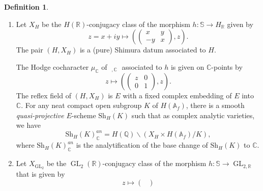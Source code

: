 \documentclass[11pt, a4paper]{amsart}
\theoremstyle{plain}
\theoremstyle{definition}
\newtheorem{definition}[theorem]{Definition}
\numberwithin{equation}{section}
\def\AAA{\mathbb{A}}
\def\CC{\mathbb{C}}
\def\QQ{\mathbb{Q}}
\def\RR{\mathbb{R}}
\DeclareMathOperator{\GL}{\mathrm{GL}}
\DeclareMathOperator{\Gm}{\mathrm{G_{m}}}
\newcommand{\Sh}{\mathrm{Sh}}
\begin{document}
\begin{definition}
\begin{enumerate}
              \begin{equation*}
                  \Sh_{G}(L)_{\CC}^{an} = G(\QQ) \backslash (X_{G} \times G(\AAA_f) / L), 
              \end{equation*}
              where $\Sh_{G}(L)_{\CC}^{an}$ is the analytification of the base change of $\Sh_{G}(L)$ to $\CC$. 
              \item  Let $X_{H}$ be the $H(\RR)$-conjugacy class of the morphism $h \colon \mathbb{S} \rightarrow H_{\RR}$ given by 
              \begin{equation*}
                  z = x + iy \mapsto (\begin{pmatrix}
                                        x & y \\
                                        -y & x
                                     \end{pmatrix}, z). 
              \end{equation*}
              The pair $(H, X_H)$ is a (pure) Shimura datum associated to $H$. 
              \par The Hodge cocharacter $\mu_{\CC}$ of $\Gm_{, \CC}$ associated to $h$ is given on $\CC$-points by 
              \begin{equation*}
                  z \mapsto (\begin{pmatrix}
                                z & 0 \\
                                0 & 1 
                            \end{pmatrix}, z).
              \end{equation*}
              The reflex field of $(H, X_H)$ is $E$ with a fixed complex embedding of $E$ into $\CC$. 
              For any neat compact open subgroup $K$ of $H(\AAA_f)$, there is a smooth \textit{quasi-projective} $E$-scheme $\Sh_{H}(K)$ such that as complex analytic varieties, we have 
              \begin{equation*}
                  \Sh_{H}(K)_{\CC}^{an} = H(\QQ) \backslash (X_H \times H(\AAA_f) / K), 
              \end{equation*}
              where $\Sh_{H}(K)_{\CC}^{an}$ is the analytification of the base change of $\Sh_{H}(K)$ to $\CC$.
        \item Let $X_{\GL_2}$ be the $\GL_2(\RR)$-conjugacy class of the morphism $h \colon \mathbb{S} \rightarrow \GL_{2,\RR}$ that is given by 
              \begin{equation*}
                  z \mapsto \begin{pmatrix}

\end{pmatrix}
\end{equation*}
\end{enumerate}
\end{definition}
\end{document}

